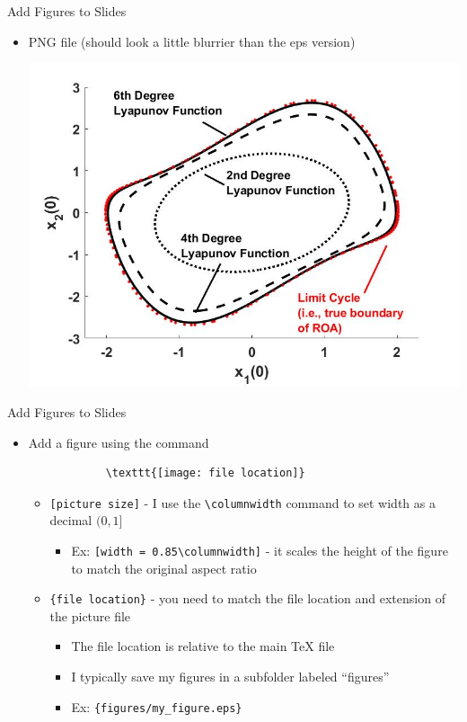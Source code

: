 \begin{frame}[fragile,t]{Add Figures to Slides}
	\begin{itemize}
		\item PNG file (should look a little blurrier than the eps version)
		\begin{center}
			\includegraphics[width=0.85\columnwidth]{figures/my_figure.jpg}
		\end{center}
	\end{itemize}
\end{frame}


\begin{frame}[fragile,t]{Add Figures to Slides}
	\begin{itemize}
		\item Add a figure using the command
		\begin{verbatim}
			\texttt{[image: file location]}
		\end{verbatim}
		\begin{itemize}
			\item \verb|[picture size]| - I use the \verb|\columnwidth| command to set width as a decimal $(0,1]$
			\begin{itemize}
				\item Ex: \verb|[width = 0.85\columnwidth]| - it scales the height of the figure to match the original aspect ratio
			\end{itemize}
			\item \verb|{file location}| - you need to match the file location and extension of the picture file
			\begin{itemize}
				\item The file location is relative to the main TeX file
				\item I typically save my figures in a subfolder labeled ``figures''
				\item Ex: \verb|{figures/my_figure.eps}|
			\end{itemize}
		\end{itemize}
	\end{itemize}
\end{frame}


